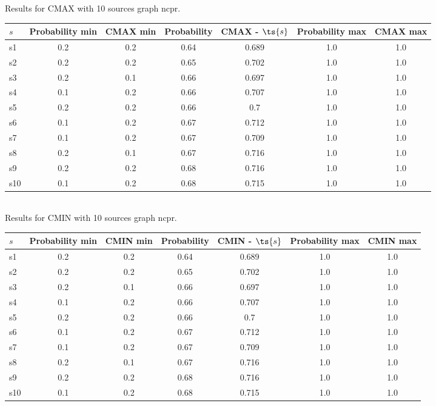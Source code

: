 \documentclass{article}
\begin{document}
\noindent Results for CMAX with 10 sources graph ncpr.

\noindent\begin{tabular}{|l|c|c|c|c|c|c|}
\hline
$s$& Probability min & CMAX min & Probability & CMAX - $\ts{s}$ & Probability max & CMAX max\\
\hline
s1 &0.2 & 0.2 & 0.64 & 0.689 & 1.0 & 1.0\\
\hline
s2 &0.2 & 0.2 & 0.65 & 0.702 & 1.0 & 1.0\\
\hline
s3 &0.2 & 0.1 & 0.66 & 0.697 & 1.0 & 1.0\\
\hline
s4 &0.1 & 0.2 & 0.66 & 0.707 & 1.0 & 1.0\\
\hline
s5 &0.2 & 0.2 & 0.66 & 0.7 & 1.0 & 1.0\\
\hline
s6 &0.1 & 0.2 & 0.67 & 0.712 & 1.0 & 1.0\\
\hline
s7 &0.1 & 0.2 & 0.67 & 0.709 & 1.0 & 1.0\\
\hline
s8 &0.2 & 0.1 & 0.67 & 0.716 & 1.0 & 1.0\\
\hline
s9 &0.2 & 0.2 & 0.68 & 0.716 & 1.0 & 1.0\\
\hline
s10 &0.1 & 0.2 & 0.68 & 0.715 & 1.0 & 1.0\\
\hline
\end{tabular}\\

\noindent Results for CMIN with 10 sources graph ncpr.

\noindent\begin{tabular}{|l|c|c|c|c|c|c|}
\hline
$s$& Probability min & CMIN min & Probability & CMIN - $\ts{s}$ & Probability max & CMIN max\\
\hline
s1 &0.2 & 0.2 & 0.64 & 0.689 & 1.0 & 1.0\\
\hline
s2 &0.2 & 0.2 & 0.65 & 0.702 & 1.0 & 1.0\\
\hline
s3 &0.2 & 0.1 & 0.66 & 0.697 & 1.0 & 1.0\\
\hline
s4 &0.1 & 0.2 & 0.66 & 0.707 & 1.0 & 1.0\\
\hline
s5 &0.2 & 0.2 & 0.66 & 0.7 & 1.0 & 1.0\\
\hline
s6 &0.1 & 0.2 & 0.67 & 0.712 & 1.0 & 1.0\\
\hline
s7 &0.1 & 0.2 & 0.67 & 0.709 & 1.0 & 1.0\\
\hline
s8 &0.2 & 0.1 & 0.67 & 0.716 & 1.0 & 1.0\\
\hline
s9 &0.2 & 0.2 & 0.68 & 0.716 & 1.0 & 1.0\\
\hline
s10 &0.1 & 0.2 & 0.68 & 0.715 & 1.0 & 1.0\\
\hline
\end{tabular}\\
\end{document}
